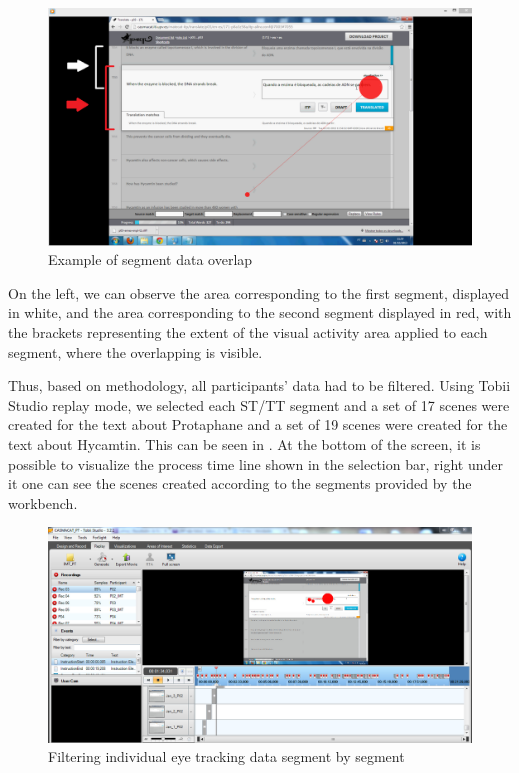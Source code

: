\documentclass[output=paper]{langsci/langscibook}
\begin{document}
  
\begin{figure}
 \includegraphics[width=\textwidth]{figures/Alves4_neu.png}
 \caption{Example of segment data overlap}
 \label{sarto:fig:4}
\end{figure} 


On the left, we can observe the area corresponding to the first segment, displayed in white, and the area corresponding to the second segment displayed in red, with the brackets representing the extent of the visual activity area applied to each segment, where the overlapping is visible. 



Thus, based on \citet{alves2012} methodology, all participants' data had to be filtered. Using Tobii Studio replay mode, we selected each ST/TT segment and a set of 17 scenes were created for the text about Protaphane and a set of 19 scenes were created for the text about Hycamtin. This can be seen in .  At the bottom of the screen, it is possible to visualize the process time line shown in the selection bar, right under it one can see the scenes created according to the segments provided by the  workbench. 


\begin{figure}
 \includegraphics[width=\textwidth]{figures/Alves5_neu.jpg}
 \caption{Filtering individual eye tracking data segment by segment}
 \label{sarto:fig:5}
\end{figure} 
\end{document}
